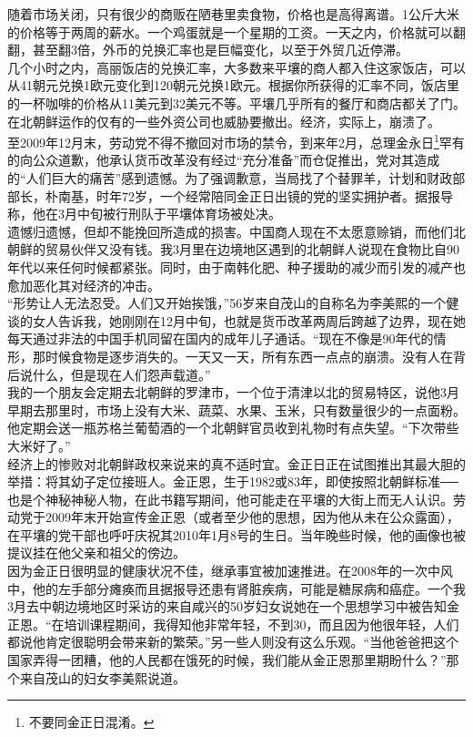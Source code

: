 随着市场关闭，只有很少的商贩在陋巷里卖食物，价格也是高得离谱。1公斤大米的价格等于两周的薪水。一个鸡蛋就是一个星期的工资。一天之内，价格就可以翻翻，甚至翻3倍，外币的兑换汇率也是巨幅变化，以至于外贸几近停滞。\\

几个小时之内，高丽饭店的兑换汇率，大多数来平壤的商人都入住这家饭店，可以从41朝元兑换1欧元变化到120朝元兑换1欧元。根据你所获得的汇率不同，饭店里的一杯咖啡的价格从11美元到32美元不等。平壤几乎所有的餐厅和商店都关了门。在北朝鲜运作的仅有的一些外资公司也威胁要撤出。经济，实际上，崩溃了。\\

至2009年12月末，劳动党不得不撤回对市场的禁令，到来年2月，总理金永日\footnote{不要同金正日混淆。}罕有的向公众道歉，他承认货币改革没有经过“充分准备”而仓促推出，党对其造成的“人们巨大的痛苦”感到遗憾。为了强调歉意，当局找了个替罪羊，计划和财政部部长，朴南基，时年72岁，一个经常陪同金正日出镜的党的坚实拥护者。据报导称，他在3月中旬被行刑队于平壤体育场被处决。\\

遗憾归遗憾，但却不能挽回所造成的损害。中国商人现在不太愿意赊销，而他们北朝鲜的贸易伙伴又没有钱。我3月里在边境地区遇到的北朝鲜人说现在食物比自90年代以来任何时候都紧张。同时，由于南韩化肥、种子援助的减少而引发的减产也愈加恶化其对经济的冲击。\\

“形势让人无法忍受。人们又开始挨饿，”56岁来自茂山的自称名为李美熙的一个健谈的女人告诉我，她刚刚在12月中旬，也就是货币改革两周后跨越了边界，现在她每天通过非法的中国手机同留在国内的成年儿子通话。“现在不像是90年代的情形，那时候食物是逐步消失的。一天又一天，所有东西一点点的崩溃。没有人在背后说什么，但是现在人们怨声载道。”\\

我的一个朋友会定期去北朝鲜的罗津市，一个位于清津以北的贸易特区，说他3月早期去那里时，市场上没有大米、蔬菜、水果、玉米，只有数量很少的一点面粉。他定期会送一瓶苏格兰葡萄酒的一个北朝鲜官员收到礼物时有点失望。“下次带些大米好了。”\\

经济上的惨败对北朝鲜政权来说来的真不适时宜。金正日正在试图推出其最大胆的举措：将其幼子定位接班人。金正恩，生于1982或83年，即使按照北朝鲜标准──也是个神秘神秘人物，在此书籍写期间，他可能走在平壤的大街上而无人认识。劳动党于2009年末开始宣传金正恩（或者至少他的思想，因为他从未在公众露面），在平壤的党干部也呼吁庆祝其2010年1月8号的生日。当年晚些时候，他的画像也被提议挂在他父亲和祖父的傍边。\\

因为金正日很明显的健康状况不佳，继承事宜被加速推进。在2008年的一次中风中，他的左手部分瘫痪而且据报导还患有肾脏疾病，可能是糖尿病和癌症。一个我3月去中朝边境地区时采访的来自咸兴的50岁妇女说她在一个思想学习中被告知金正恩。“在培训课程期间，我得知他非常年轻，不到30，而且因为他很年轻，人们都说他肯定很聪明会带来新的繁荣。”另一些人则没有这么乐观。“当他爸爸把这个国家弄得一团糟，他的人民都在饿死的时候，我们能从金正恩那里期盼什么？”那个来自茂山的妇女李美熙说道。\\

